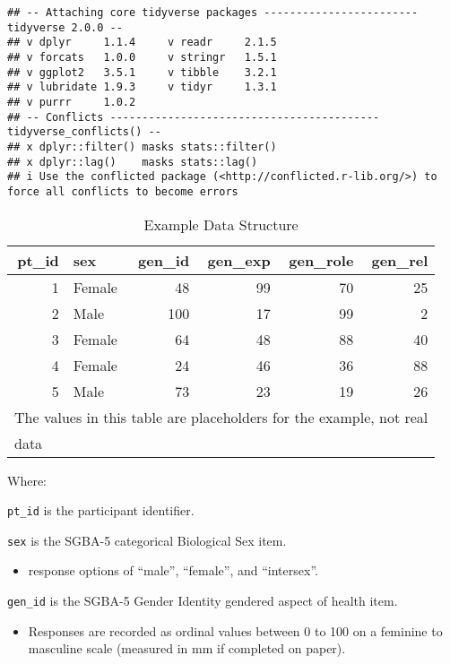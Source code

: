 \documentclass[
]{book}
\providecommand{\tightlist}{%
  \setlength{\itemsep}{0pt}\setlength{\parskip}{0pt}}
\begin{document}
\begin{verbatim}
## -- Attaching core tidyverse packages ------------------------ tidyverse 2.0.0 --
## v dplyr     1.1.4     v readr     2.1.5
## v forcats   1.0.0     v stringr   1.5.1
## v ggplot2   3.5.1     v tibble    3.2.1
## v lubridate 1.9.3     v tidyr     1.3.1
## v purrr     1.0.2     
## -- Conflicts ------------------------------------------ tidyverse_conflicts() --
## x dplyr::filter() masks stats::filter()
## x dplyr::lag()    masks stats::lag()
## i Use the conflicted package (<http://conflicted.r-lib.org/>) to force all conflicts to become errors
\end{verbatim}

\begin{table}

\caption{\label{tab:01-data}Example Data Structure}
\centering
\begin{tabular}[t]{rlrrrr}
\toprule
pt\_id & sex & gen\_id & gen\_exp & gen\_role & gen\_rel\\
\midrule
1 & Female & 48 & 99 & 70 & 25\\
2 & Male & 100 & 17 & 99 & 2\\
3 & Female & 64 & 48 & 88 & 40\\
4 & Female & 24 & 46 & 36 & 88\\
5 & Male & 73 & 23 & 19 & 26\\
\bottomrule
\multicolumn{6}{l}{\textsuperscript{} The values in this table are placeholders for the example, not real}\\
\multicolumn{6}{l}{data}\\
\end{tabular}
\end{table}

Where:

\texttt{pt\_id} is the participant identifier.

\texttt{sex} is the SGBA-5 categorical Biological Sex item.

\begin{itemize}
\tightlist
\item
  response options of ``male'', ``female'', and ``intersex''.
\end{itemize}

\texttt{gen\_id} is the SGBA-5 Gender Identity gendered aspect of health item.

\begin{itemize}
\tightlist
\item
  Responses are recorded as ordinal values between 0 to 100 on a feminine to masculine scale (measured in mm if completed on paper).
\end{itemize}
\end{document}
